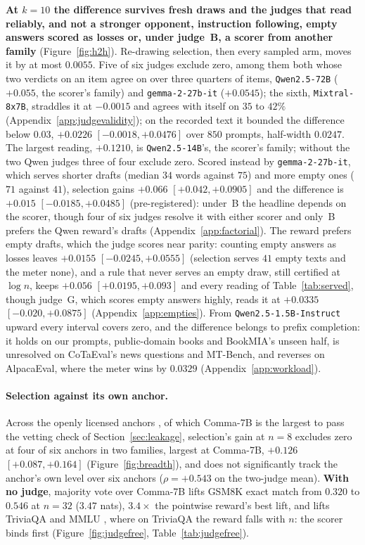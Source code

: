 \textbf{At $k=10$ the difference survives fresh draws and the judges that read reliably, and not a stronger
opponent, instruction following, empty answers scored as losses or, under judge~B, a scorer from another family}
(Figure~\ref{fig:h2h}). Re-drawing selection, then every sampled arm, moves it by at most $0.0055$. Five of six judges
exclude zero, among them both whose two verdicts on an item agree on over three quarters of items,
\texttt{Qwen2.5-72B} ($+0.055$, the scorer's family) and \texttt{gemma-2-27b-it} ($+0.0545$); the sixth,
\texttt{Mixtral-8x7B}, straddles it at $-0.0015$ and agrees with itself on $35$ to $42\%$
(Appendix~\ref{app:judgevalidity}); on the recorded text it bounded the difference below $0.03$, $+0.0226$
$[-0.0018, +0.0476]$ over $850$ prompts, half-width $0.0247$. The largest reading, $+0.1210$, is
\texttt{Qwen2.5-14B}'s, the scorer's family; without the two Qwen judges three of four exclude zero. Scored instead by \texttt{gemma-2-27b-it}, which serves
shorter drafts (median $34$ words against $75$) and more empty ones ($71$ against $41$), selection gains
$+0.066$ $[+0.042, +0.0905]$ and the difference is $+0.015$ $[-0.0185, +0.0485]$ (pre-registered): under~B
the headline depends on the scorer, though four of six judges resolve it with either scorer and only~B prefers the
Qwen reward's drafts (Appendix~\ref{app:factorial}). The reward prefers empty drafts, which the judge scores
near parity: counting empty answers as losses leaves $+0.0155$ $[-0.0245, +0.0555]$ (selection serves $41$ empty texts
and the meter none), and a rule that never serves an empty draw, still certified at $\log n$, keeps $+0.056$
$[+0.0195, +0.093]$ and every reading of Table~\ref{tab:served}, though judge~G, which scores empty
answers highly, reads it at $+0.0335$ $[-0.020, +0.0875]$ (Appendix~\ref{app:empties}). From
\texttt{Qwen2.5-1.5B-Instruct} upward every interval covers zero, and the difference belongs to prefix
completion: it holds on our prompts, public-domain books and BookMIA's unseen half, is unresolved on
CoTaEval's news questions and MT-Bench, and reverses on AlpacaEval, where the meter wins by $0.0329$
(Appendix~\ref{app:workload}).

\paragraph{Selection against its own anchor.}\label{sec:breadth} Across the openly licensed anchors
\citep{kandpal2025commonpile,langlais2026commoncorpus,bommarito2025kl3m}, of which Comma-7B is the largest to
pass the vetting check of Section~\ref{sec:leakage}, selection's gain at $n=8$ excludes zero at four of six anchors in
two families, largest at Comma-7B, $+0.126$ $[+0.087, +0.164]$ (Figure~\ref{fig:breadth}), and does not
significantly track the anchor's own level over six anchors ($\rho = +0.543$ on the two-judge mean). \textbf{With no judge}, majority vote over Comma-7B
lifts GSM8K \citep{cobbe2021gsm8k} exact match from $0.320$ to $0.546$ at $n=32$ ($3.47$ nats), $3.4\times$ the pointwise reward's
best lift, and lifts TriviaQA and MMLU \citep{hendrycks2021mmlu}, where on TriviaQA the reward falls with $n$:
the scorer binds first (Figure~\ref{fig:judgefree}, Table~\ref{tab:judgefree}).

